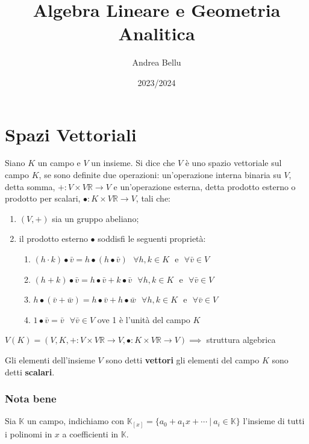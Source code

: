 \documentclass{article}
\title{Algebra Lineare e Geometria Analitica}
\author{Andrea Bellu}
\date{2023/2024}
\begin{document}
\maketitle

\tableofcontents

\section{Spazi Vettoriali}
Siano $K$ un campo e $V$ un insieme. Si dice che $V$ è uno spazio vettoriale
sul campo $K$, se sono definite due operazioni: un’operazione interna binaria
su $V$, detta somma, $+: V \times V \mathbb{R}\rightarrow V$ e un’operazione
esterna, detta prodotto esterno o prodotto per scalari, $\bullet : K \times V \mathbb{R}\rightarrow V$, tali che:

\begin{enumerate}
    \item $(V, +)$ sia un gruppo abeliano;
    \item il prodotto esterno $\bullet$ soddisfi le seguenti proprietà:
          \begin{enumerate}
              \item $(h\cdot k)\bullet \bar{v} = h\bullet(h\bullet \bar{v}) \ \ \ \forall h,k \in K \ \ \ \text{e} \ \ \ \forall \bar{v} \in V$
              \item $(h+ k)\bullet \bar{v} = h\bullet \bar{v}+k\bullet \bar{v} \ \ \ \forall h,k \in K \ \ \ \text{e} \ \ \ \forall \bar{v} \in V$
              \item $h\bullet(\bar{v}+\bar{w}) = h\bullet\bar{v}+h\bullet\bar{w} \ \ \ \forall h,k \in K \ \ \ \text{e} \ \ \ \forall \bar{v} \in V$
              \item $1\bullet \bar{v} = \bar{v} \ \ \ \forall \bar{v} \in V$ ove 1 è l’unità del campo $K$
          \end{enumerate}
\end{enumerate}

$V(K) = (V, K, +:V\times V\mathbb{R}\rightarrow V, \bullet:K\times V\mathbb{R}\rightarrow V) \implies$ struttura algebrica

Gli elementi dell’insieme $V$ sono detti \textbf{vettori} gli elementi del
campo $K$ sono detti \textbf{scalari}.

\subsubsection{Nota bene}
Sia $\mathbb K$ un campo, indichiamo con $\mathbb K_{[x]}=\{a_0+a_1x+\cdots \ | \ a_i\in\mathbb K\}$ l'insieme di tutti i polinomi in $x$ a coefficienti in $\mathbb K$.
\end{document}
